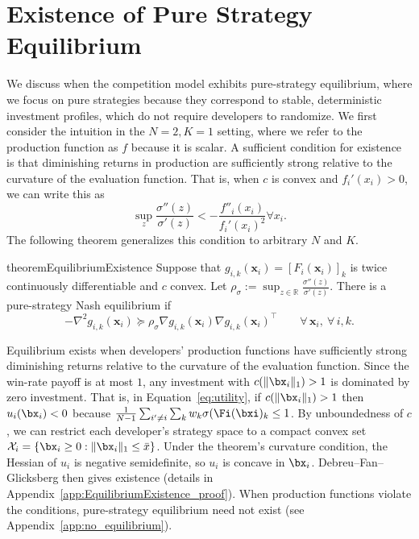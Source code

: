 \section{Existence of Pure Strategy Equilibrium}
\label{sec:equilibrium}
We discuss when the competition model exhibits pure-strategy equilibrium, where we focus on pure strategies because they correspond to stable, deterministic investment profiles, which do not require developers to randomize. 
We first consider the intuition in the \(N=2,K=1\) setting, where we refer to the production function as $f$ because it is scalar. 
A sufficient condition for existence is that diminishing returns in production are sufficiently strong relative to the curvature of the evaluation function. 
That is, when $c$ is convex and $f_{i}'(x_i) > 0$, we can write this as 
\[
 \sup_z \frac{\sigma''(z)}{\sigma'(z) } < -\frac{f''_i(x_i)}{f_i'(x_i)^2} \forall x_i.
\]
The following theorem generalizes this condition to arbitrary \(N\) and \(K\).
\begin{restatable}{theorem}{EquilibriumExistence} 
\label{thm:EquilibriumExistence} 
Suppose that $g_{i,k}(\mathbf{x}_i)=[F_i(\mathbf{x}_i)]_k$ is twice continuously differentiable and $c$ convex. 
Let $\rho_\sigma := \sup_{z\in\mathbb{R}}\frac{\sigma''(z)}{\sigma'(z)}$.  
There is a pure-strategy Nash equilibrium if
\[ -\nabla^2 g_{i,k}(\mathbf{x}_i) \succeq \rho_\sigma \nabla g_{i,k}(\mathbf{x}_i) \nabla g_{i,k}(\mathbf{x}_i)^\top \qquad \forall\,\mathbf{x}_i,\ \forall\,i,k. 
\] 
\end{restatable}

Equilibrium exists when developers' production functions have sufficiently strong diminishing returns relative to the curvature of the evaluation function.
Since the win-rate payoff is at most \(1\), any investment with \(c(\|\bx_i\|_1)>1\) is dominated by zero investment. 
That is, in Equation~\ref{eq:utility}, if $c(\|\bx_i\|_1)>1$ then $u_{i}(\bx_i) < 0$ because $\frac{1}{N-1} \sum_{i' \neq i} \sum_{k} w_{k} \sigma(\Fi(\bxi)_k \leq 1$. 
By unboundedness of \(c\), we can restrict each developer's strategy space to a compact convex set \(\mathcal X_i=\{\bx_i\ge0:\|\bx_i\|_1\le\bar x\}\).
Under the theorem's curvature condition, the Hessian of \(u_i\) is negative semidefinite, so \(u_i\) is concave in \(\bx_i\). Debreu–Fan–Glicksberg then gives existence (details in Appendix~\ref{app:EquilibriumExistence_proof}). 
When production functions violate the conditions, pure-strategy equilibrium need not exist (see Appendix~\ref{app:no_equilibrium}).

